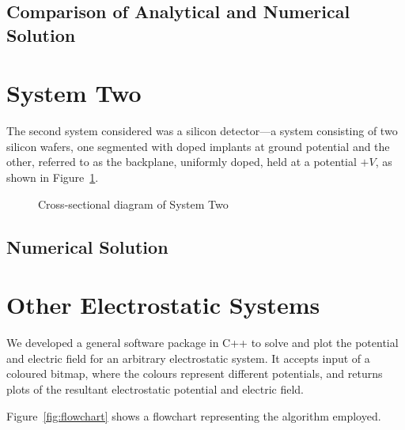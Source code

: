 \documentclass[12pt, a4paper]{article}
\begin{document}
\subsection{Comparison of Analytical and Numerical Solution}

\section{System Two}

The second system considered was a silicon detector---a system consisting of two
silicon wafers, one segmented with doped implants at ground potential and the other,
referred to as the backplane, uniformly doped, held at a potential $+V$, as shown
in Figure~\ref{fig:sys two}.

\begin{figure}[h!]
\begin{center}
\end{center}
\caption{Cross-sectional diagram of System Two}
\label{fig:sys two}
\end{figure}

\subsection{Numerical Solution}

\section{Other Electrostatic Systems}

We developed a general software package in C++ to solve and plot the potential and
electric field for an arbitrary electrostatic system. It accepts input of a coloured
bitmap, where the colours represent different potentials, and returns plots of the
resultant electrostatic potential and electric field.

Figure~\ref{fig:flowchart} shows a flowchart representing the algorithm employed.
\end{document}
